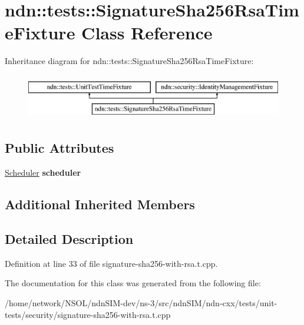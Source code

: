 \hypertarget{classndn_1_1tests_1_1SignatureSha256RsaTimeFixture}{}\section{ndn\+:\+:tests\+:\+:Signature\+Sha256\+Rsa\+Time\+Fixture Class Reference}
\label{classndn_1_1tests_1_1SignatureSha256RsaTimeFixture}
Inheritance diagram for ndn\+:\+:tests\+:\+:Signature\+Sha256\+Rsa\+Time\+Fixture\+:\begin{figure}[H]
\begin{center}
\leavevmode
\includegraphics[height=2.000000cm]{classndn_1_1tests_1_1SignatureSha256RsaTimeFixture}
\end{center}
\end{figure}
\subsection*{Public Attributes}
\begin{DoxyCompactItemize}
\item 
\hyperlink{classndn_1_1util_1_1scheduler_1_1Scheduler}{Scheduler} {\bfseries scheduler}\hypertarget{classndn_1_1tests_1_1SignatureSha256RsaTimeFixture_a70ed50e9480c4144ca4f588079f2de29}{}\label{classndn_1_1tests_1_1SignatureSha256RsaTimeFixture_a70ed50e9480c4144ca4f588079f2de29}

\end{DoxyCompactItemize}
\subsection*{Additional Inherited Members}


\subsection{Detailed Description}


Definition at line 33 of file signature-\/sha256-\/with-\/rsa.\+t.\+cpp.



The documentation for this class was generated from the following file\+:\begin{DoxyCompactItemize}
\item 
/home/network/\+N\+S\+O\+L/ndn\+S\+I\+M-\/dev/ns-\/3/src/ndn\+S\+I\+M/ndn-\/cxx/tests/unit-\/tests/security/signature-\/sha256-\/with-\/rsa.\+t.\+cpp\end{DoxyCompactItemize}
